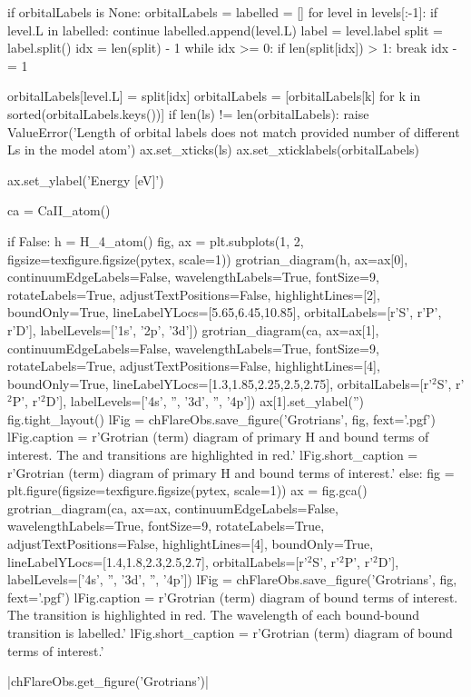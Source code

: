 \begin{pycode}[FlareObs]
    if orbitalLabels is None:
        orbitalLabels = {}
        labelled = []
        for level in levels[:-1]:
            if level.L in labelled:
                continue
            labelled.append(level.L)
            label = level.label
            split = label.split()
            idx = len(split) - 1
            while idx >= 0:
                if len(split[idx]) > 1:
                    break
                idx -= 1

            orbitalLabels[level.L] = split[idx]
        orbitalLabels = [orbitalLabels[k] for k in sorted(orbitalLabels.keys())]
    if len(ls) != len(orbitalLabels):
        raise ValueError('Length of orbital labels does not match provided number of different Ls in the model atom')
    ax.set_xticks(ls)
    ax.set_xticklabels(orbitalLabels)

    ax.set_ylabel('Energy [eV]')

ca = CaII_atom()

if False:
    h = H_4_atom()
    fig, ax = plt.subplots(1, 2, figsize=texfigure.figsize(pytex, scale=1))
    grotrian_diagram(h, ax=ax[0], continuumEdgeLabels=False, wavelengthLabels=True, fontSize=9, rotateLabels=True, adjustTextPositions=False, highlightLines=[2], boundOnly=True, lineLabelYLocs=[5.65,6.45,10.85], orbitalLabels=[r'S', r'P', r'D'], labelLevels=['1s', '2p', '3d'])
    grotrian_diagram(ca, ax=ax[1], continuumEdgeLabels=False, wavelengthLabels=True, fontSize=9, rotateLabels=True, adjustTextPositions=False, highlightLines=[4], boundOnly=True, lineLabelYLocs=[1.3,1.85,2.25,2.5,2.75], orbitalLabels=[r'$^2$S', r'$^2$P', r'$^2$D'], labelLevels=['4s', '', '3d', '', '4p'])
    ax[1].set_ylabel('')
    fig.tight_layout()
    lFig = chFlareObs.save_figure('Grotrians', fig, fext='.pgf')
    lFig.caption = r'Grotrian (term) diagram of primary H and \Caii{} bound terms of interest. The \Ha{} and \CaLine{} transitions are highlighted in red.'
    lFig.short_caption = r'Grotrian (term) diagram of primary H and \Caii{} bound terms of interest.'
else:
    fig = plt.figure(figsize=texfigure.figsize(pytex, scale=1))
    ax = fig.gca()
    grotrian_diagram(ca, ax=ax, continuumEdgeLabels=False, wavelengthLabels=True, fontSize=9, rotateLabels=True, adjustTextPositions=False, highlightLines=[4], boundOnly=True, lineLabelYLocs=[1.4,1.8,2.3,2.5,2.7], orbitalLabels=[r'$^2$S', r'$^2$P', r'$^2$D'], labelLevels=['4s', '', '3d', '', '4p'])
    lFig = chFlareObs.save_figure('Grotrians', fig, fext='.pgf')
    lFig.caption = r'Grotrian (term) diagram of \Caii{} bound terms of interest. The \CaLine{} transition is highlighted in red. The wavelength of each bound-bound transition is labelled.'
    lFig.short_caption = r'Grotrian (term) diagram of \Caii{} bound terms of interest.'

\end{pycode}
\py[FlareObs]|chFlareObs.get_figure('Grotrians')|

